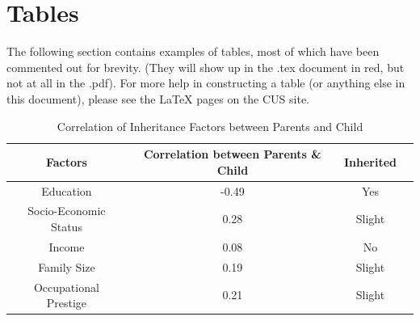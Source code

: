 \documentclass[12pt,twoside]{reedthesis}
\begin{document}
\section{Tables}
	The following section contains examples of tables, most of which have been commented out for brevity. (They will show up in the .tex document in red, but not at all in the .pdf). For more help in constructing a table (or anything else in this document), please see the LaTeX pages on the CUS site. 

\begin{table}[htbp] %
\caption[Correlation of Inheritance Factors between Parents and Child]{Correlation of Inheritance Factors between Parents and Child} 
\begin{center} 
\begin{tabular}{c c c c} 
\toprule %
  Factors &  Correlation between Parents \& Child & Inherited \\ %
  \midrule %
	Education 				& -0.49 & Yes 	 \\ %
	Socio-Economic Status 	& 0.28 	& Slight \\
	Income 					& 0.08 	& No	 \\
	Family Size 			& 0.19 	& Slight \\
	Occupational Prestige 	& 0.21 	& Slight \\
\bottomrule %
\end{tabular}
\end{center}
\label{inheritance} %
\end{table}
\end{document}
